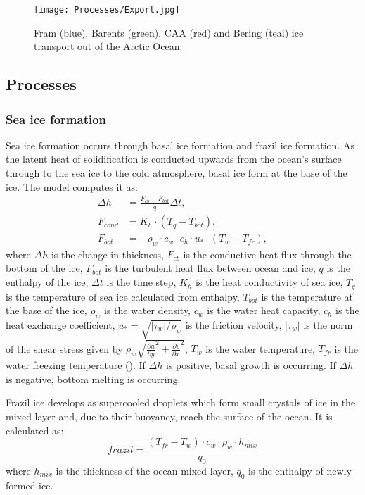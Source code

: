 \begin{figure}
\center
\noindent\texttt{[image: Processes/Export.jpg]}
\caption{Fram (blue), Barents (green), CAA (red) and Bering (teal) ice transport out of the Arctic Ocean.}
\label{export}
\end{figure}



\subsection{Processes}
\subsubsection{Sea ice formation}\label{forma}

Sea ice formation occurs through basal ice formation and frazil ice formation. As the latent heat of solidification is conducted upwards from the ocean's surface through to the sea ice to the cold atmosphere, basal ice form at the base of the ice. The model computes it as:
\begin{align}
\Delta h &= \frac{F_{cb} - F_{bot}}{q} \Delta t, \label{eq1}\\ 
F_{cond} &= K_h \cdot (T_q - T_{bot}), \label{eq2}\\
F_{bot} &= - \rho_w \cdot c_w \cdot c_h \cdot u_* \cdot (T_w - T_{fr}),\label{eq3}
\end{align}
where $\Delta h$ is the change in thickness, $F_{cb}$ is the conductive heat flux through the bottom of the ice, $F_{bot}$ is the turbulent heat flux between ocean and ice, $q$ is the enthalpy of the ice, $\Delta t$ is the time step, $K_h$ is the heat conductivity of sea ice, $T_q$ is the temperature of sea ice calculated from enthalpy, $T_{bot}$ is the temperature at the base of the ice, $\rho_w$ is the water density, $c_w$ is the water heat capacity, $c_h$ is the heat exchange coefficient, $u_* = \sqrt{|\tau_w|/\rho_w}$ is the friction velocity, $|\tau_w|$ is the norm of the shear stress given by $\rho_w \sqrt{\frac{\partial u}{\partial y}^2+\frac{\partial v}{\partial x}^2}$, $T_w$ is the water temperature, $T_{fr}$ is the water freezing temperature (\cite{Hunke:2008ly}). If $\Delta h$ is positive, basal growth is occurring. If $\Delta h$ is negative, bottom melting is occurring.  

Frazil ice develops as supercooled droplets which form small crystals of ice in the mixed layer and, due to their buoyancy, reach the surface of the ocean. It is calculated as:
\begin{equation}\label{eqfraz}
frazil = \frac{(T_{fr} - T_w)\cdot c_w \cdot \rho_w \cdot h_{mix}}{q_0} 
\end{equation}
where $h_{mix}$ is the thickness of the ocean mixed layer, $q_0$ is the enthalpy of newly formed ice. 

